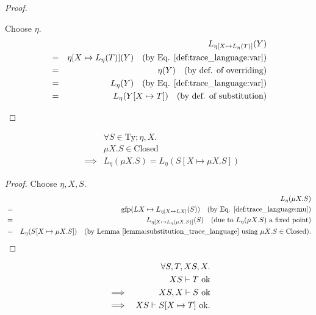 \documentclass{llncs}
\newcommand*{\Ty}{\mathrm{Ty}}
\newcommand*{\gfp}{\mathrm{gfp}}
\newcommand*{\Closed}{\mathrm{Closed}}
\newcommand*{\ok}[1]{\text{$#1$ {\normalfont \rmfamily ok}}}
\newcommand*{\envimpl}       [2]{#1 \vdash #2}
\newcommand*{\envimplok}     [2]{\envimpl{#1}{\ok{#2}}}
\renewcommand*{\|}{\;|\;}
\begin{document}
\begin{proof}
\begin{enumerate}
      Choose $\eta$.
      \begin{eqnarray*}
        &&  L_{\eta[X \mapsto L_\eta(T)]}(Y) \\
        &=& \eta[X \mapsto L_\eta(T)](Y)
            \quad \text{(by Eq. \ref{def:trace_language:var})} \\
        &=& \eta(Y)
            \quad \text{(by def. of overriding)} \\
        &=& L_\eta(Y)
            \quad \text{(by Eq. \ref{def:trace_language:var})} \\
        &=& L_\eta(Y[X \mapsto T])
            \quad \text{(by def. of substitution)}
      \end{eqnarray*}

  \end{enumerate}
\end{proof}


\begin{lemma}
  \label{lemma:mu_expansion_trace_language}
  \begin{eqnarray*}
    &&         \forall S \in \Ty; \eta, X. \\
    &&         \mu X.S \in \Closed \\
    &\implies& L_\eta(\mu X.S) = L_\eta(S[X \mapsto \mu X.S])
  \end{eqnarray*}
\end{lemma}

\begin{proof}
  Choose $\eta, X, S$.
  \begin{eqnarray*}
    &&  L_\eta(\mu X.S) \\
    &=& \gfp(LX \mapsto L_{\eta[X \mapsto LX]}(S))
        \quad \text{(by Eq. \ref{def:trace_language:mu})} \\
    &=& L_{\eta[X \mapsto L_\eta(\mu X.S)]}(S)
        \quad \text{(due to $L_\eta(\mu X.S)$ a fixed point)} \\
    &=& L_\eta(S[X \mapsto \mu X.S])
        \quad \text{(by Lemma \ref{lemma:substitution_trace_language} using $\mu X.S \in \Closed$)}.
  \end{eqnarray*}
\end{proof}


\begin{lemma}
  \label{lemma:substitution_wellformedness}
  \begin{eqnarray*}
    &&         \forall S, T, XS, X. \\
    &&         \envimplok{XS}{T} \\
    &\implies& \envimplok{XS, X}{S} \\
    &\implies& \envimplok{XS}{S[X \mapsto T]}.
  \end{eqnarray*}
\end{lemma}
\end{document}
